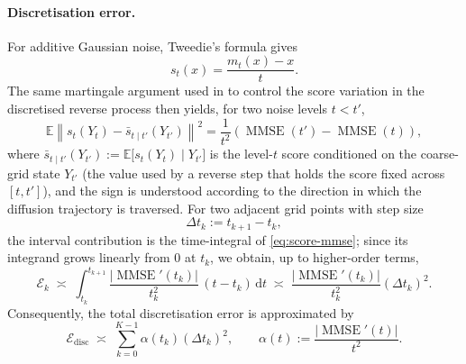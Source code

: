 \documentclass{article}
\newcommand{\dd}{\,\mathrm{d}}
\theoremstyle{plain}
\theoremstyle{definition}
\theoremstyle{remark}
\begin{document}
\paragraph{Discretisation error.}
For additive Gaussian noise, Tweedie's formula gives
\begin{equation}
    s_t(x)
    =
    \frac{m_t(x)-x}{t}.
\end{equation}
The same martingale argument used in \citep{potaptchik2024linear} to control the score variation in the discretised reverse process then yields, for two noise levels
$t<t'$,
\begin{equation}
    \mathbb{E}
    \left\|
        s_t(Y_t) - \bar{s}_{t\mid t'}(Y_{t'})
    \right\|^2
    =
    \frac{1}{t^2}
    \left(
        \operatorname{MMSE}(t')
        -
        \operatorname{MMSE}(t)
    \right),
\label{eq:score-mmse}
\end{equation}
where $\bar{s}_{t\mid t'}(Y_{t'}) := \mathbb{E}\bigl[s_t(Y_t)\mid Y_{t'}\bigr]$ is the level-$t$ score conditioned on the coarse-grid state $Y_{t'}$ (the value used by a reverse step that holds the score fixed across $[t,t']$), and the sign is understood according to the direction in which the diffusion trajectory is traversed. For two adjacent grid points with step size
\begin{equation}
    \Delta t_k := t_{k+1}-t_k,
\end{equation}
the interval contribution is the time-integral of \eqref{eq:score-mmse}; since its integrand grows linearly from $0$ at $t_k$, we obtain, up to higher-order terms,
\begin{equation}
    \mathcal{E}_k
    \;\asymp\;
    \int_{t_k}^{t_{k+1}}
    \frac{\left|\operatorname{MMSE}'(t_k)\right|}{t_k^2}\,(t-t_k)\dd t
    \;\asymp\;
    \frac{\left|\operatorname{MMSE}'(t_k)\right|}
         {t_k^2}
    (\Delta t_k)^2.
    \label{eq:local-error}
\end{equation}
Consequently, the total discretisation error is approximated by
\begin{equation}
    \mathcal{E}_{\mathrm{disc}}
    \;\asymp\;
    \sum_{k=0}^{K-1}
    \alpha(t_k)(\Delta t_k)^2,
    \qquad
    \alpha(t)
    :=
    \frac{|\operatorname{MMSE}'(t)|}{t^2}.
    \label{eq:discrete-objective}
\end{equation}
\end{document}
